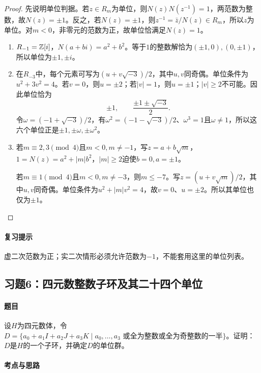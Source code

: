 \begin{proof}

先说明单位判据。若$z\in R_m$为单位，则$N(z)N(z^{-1})=1$，两范数为整数，故$N(z)=\pm1$。反之，若$N(z)=\pm1$，则$z^{-1}=\bar z/N(z)\in R_m$，所以$z$为单位。对$m<0$，非零元的范数为正，故单位恰满足$N(z)=1$。
\begin{enumerate}[label=(\roman*)]
\item $R_{-1}=\mathbb Z[i]$，$N(a+bi)=a^2+b^2$。等于$1$的整数解恰为$(\pm1,0),(0,\pm1)$，所以单位为$\pm1,\pm i$。
\item 在$R_{-3}$中，每个元素可写为$(u+v\sqrt{-3})/2$，其中$u,v$同奇偶。单位条件为$u^2+3v^2=4$。若$v=0$，则$u=\pm2$；若$|v|=1$，则$u=\pm1$；$|v|\ge2$不可能。因此单位恰为
\[
\pm1,\qquad \frac{\pm1\pm\sqrt{-3}}2.
\]
令$\omega=(-1+\sqrt{-3})/2$，有$\omega^2=(-1-\sqrt{-3})/2$、$\omega^3=1$且$\omega\ne1$，所以这六个单位正是$\pm1,\pm\omega,\pm\omega^2$。
\item 若$m\equiv2,3\pmod4$且$m<0,m\ne-1$，写$z=a+b\sqrt m$，$1=N(z)=a^2+|m|b^2$，$|m|\ge2$迫使$b=0,a=\pm1$。

若$m\equiv1\pmod4$且$m<0,m\ne-3$，则$m\le-7$。写$z=(u+v\sqrt m)/2$，其中$u,v$同奇偶。单位条件为$u^2+|m|v^2=4$，故$v=0$、$u=\pm2$。所以其单位也仅为$\pm1$。
\end{enumerate}

\end{proof}

\paragraph{复习提示}

虚二次范数为正；实二次情形必须允许范数为$-1$，不能套用这里的单位列表。

\subsection{习题6：四元数整数子环及其二十四个单位}

\label{ex:4:6}

\paragraph{题目}

设$H$为四元数体，令$D=\{a_0+a_1I+a_2J+a_3K\mid a_0,\ldots,a_3\text{ 或全为整数或全为奇整数的一半}\}$。证明：$D$是$H$的一个子环，并确定$D$的单位群。

\paragraph{考点与思路}

